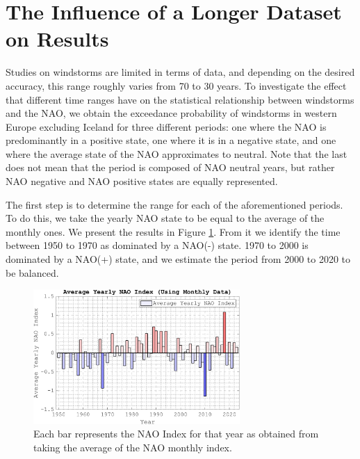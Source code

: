 \FloatBarrier
\section{The Influence of a Longer Dataset on Results}

    Studies on windstorms are limited in terms of data, and depending on the desired accuracy, this range roughly varies from 70 to 30 years. To investigate the effect that different time ranges have on the statistical relationship between windstorms and the NAO, we obtain the exceedance probability of windstorms in western Europe excluding Iceland for three different periods: one where the NAO is predominantly in a positive state, one where it is in a negative state, and one where the average state of the NAO approximates to neutral. Note that the last does not mean that the period is composed of NAO neutral years, but rather NAO negative and NAO positive states are equally represented. 

    The first step is to determine the range for each of the aforementioned periods. To do this, we take the yearly NAO state to be equal to the average of the monthly ones. We present the results in Figure \ref{fig:yearlyNAO}. From it we identify the time between 1950 to 1970 as dominated by a NAO(-) state. 1970 to 2000 is dominated by a NAO(+) state, and we estimate the period from 2000 to 2020 to be balanced.
    
        \begin{figure}
            \centering
            \includegraphics[width=0.7\textwidth]{figures/Average_NAO_Index_Yearly_from_month.png}
            \caption{ Each bar represents the NAO Index for that year as obtained from taking the average of the NAO monthly index.}
            \label{fig:yearlyNAO}
        \end{figure}

